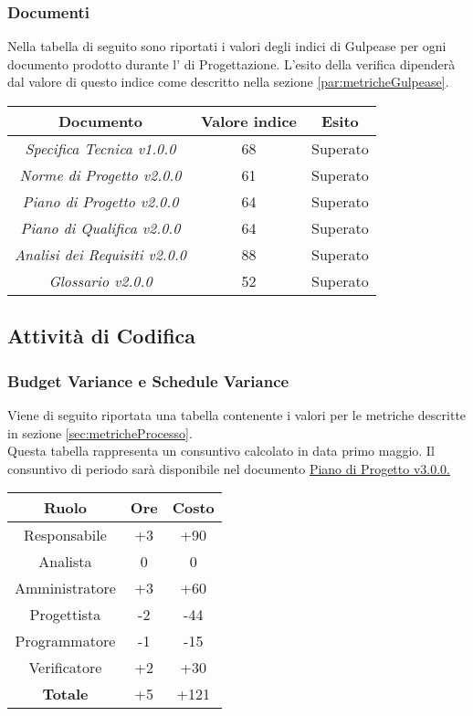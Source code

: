 \documentclass{scalatekids-article}
\begin{document}
\subsubsection{Documenti}
Nella tabella di seguito sono riportati i valori degli indici di Gulpease per ogni documento prodotto durante l' di Progettazione. L'esito della verifica dipenderà dal valore di questo indice come descritto nella sezione \ref{par:metricheGulpease}.
\begin{center}
  \begin{tabular}{| c | c | c |}
    \hline
    Documento & Valore indice & Esito\\
    \hline
    \textit{Specifica Tecnica v1.0.0} & 68 & Superato\\
    \textit{Norme di Progetto v2.0.0} & 61 & Superato\\
    \textit{Piano di Progetto v2.0.0} & 64 & Superato\\
    \textit{Piano di Qualifica v2.0.0} & 64 & Superato\\
    \textit{Analisi dei Requisiti v2.0.0} & 88 & Superato\\
    \textit{Glossario v2.0.0} & 52 & Superato\\
    \hline
  \end{tabular}
\end{center}

\subsection{Attività di Codifica}

\subsubsection{Budget Variance e Schedule Variance}
Viene di seguito riportata una tabella contenente i valori per le metriche descritte in sezione \ref{sec:metricheProcesso}.\\ Questa tabella rappresenta un consuntivo calcolato in data primo maggio. Il consuntivo di periodo sarà disponibile nel documento \href{run:./PianoDiProgetto\_v3.0.0.pdf}{Piano di Progetto v3.0.0.}
\begin{center}
  \normalsize
  \begin{tabular}{| c | c | c |}
    \hline
    \textbf{Ruolo} & \textbf{Ore} & \textbf{Costo}\\
    \hline
    Responsabile & +3 & +90\\ %
    Analista & 0 & 0\\ %
    Amministratore & +3 & +60\\ %
    Progettista & -2 & -44\\ %
    Programmatore & -1 & -15\\ %
    Verificatore & +2 & +30\\ %
    \hline
    \textbf{Totale} & +5 & +121\\
    \hline
  \end{tabular}
\end{center}
\end{document}
